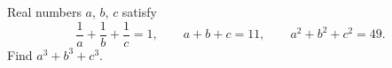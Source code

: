 Real numbers $a$, $b$, $c$ satisfy
\[\dfrac{1}{a}+\dfrac{1}{b}+\dfrac{1}{c}=1,\qquad a+b+c=11,\qquad a^2+b^2+c^2=49.\]
Find $a^3+b^3+c^3$.

